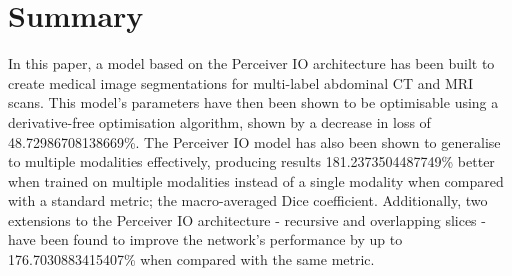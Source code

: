 \documentclass{l4proj}
\begin{document}


\section{Summary}

In this paper, a model based on the Perceiver IO architecture has been built to create medical image segmentations for multi-label abdominal CT and MRI scans. This model’s parameters have then been shown to be optimisable using a derivative-free optimisation algorithm, shown by a decrease in loss of \num{48.72986708138669}\%. The Perceiver IO model has also been shown to generalise to multiple modalities effectively, producing results \num{181.2373504487749}\% better when trained on multiple modalities instead of a single modality when compared with a standard metric; the macro-averaged Dice coefficient. Additionally, two extensions to the Perceiver IO architecture - recursive and overlapping slices - have been found to improve the network's performance by up to \num{176.7030883415407}\% when compared with the same metric.
\end{document}
